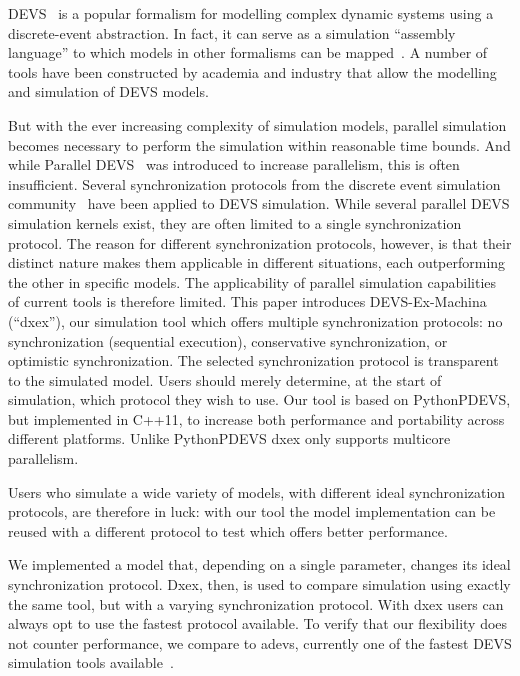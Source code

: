 \textsf{DEVS}~\cite{ClassicDEVS} is a popular formalism for modelling complex dynamic systems using a discrete-event abstraction.
In fact, it can serve as a simulation ``assembly language'' to which models in other formalisms can be mapped~\cite{DEVSbase}.
A number of tools have been constructed by academia and industry that allow the modelling and simulation of \textsf{DEVS} models.

But with the ever increasing complexity of simulation models, parallel simulation becomes necessary to perform the simulation within reasonable time bounds.
And while \textsf{Parallel DEVS}~\cite{ParallelDEVS} was introduced to increase parallelism, this is often insufficient.
Several synchronization protocols from the discrete event simulation community~\cite{FujimotoBook} have been applied to \textsf{DEVS} simulation.
While several parallel \textsf{DEVS} simulation kernels exist, they are often limited to a single synchronization protocol.
The reason for different synchronization protocols, however, is that their distinct nature makes them applicable in different situations, each outperforming the other in specific models.
The applicability of parallel simulation capabilities of current tools is therefore limited.
This paper introduces DEVS-Ex-Machina (``dxex''), our simulation tool which offers multiple synchronization protocols: no synchronization (sequential execution), conservative synchronization, or optimistic synchronization.
The selected synchronization protocol is transparent to the simulated model.
Users should merely determine, at the start of simulation, which protocol they wish to use.
Our tool is based on PythonPDEVS, but implemented in C++11, to increase both performance and portability across different platforms. Unlike PythonPDEVS dxex only supports multicore parallelism.

Users who simulate a wide variety of models, with different ideal synchronization protocols, are therefore in luck:
with our tool the model implementation can be reused with a different protocol to test which offers better performance.


We implemented a model that, depending on a single parameter, changes its ideal synchronization protocol.
Dxex, then, is used to compare simulation using exactly the same tool, but with a varying synchronization protocol. With dxex users can always opt to use the fastest protocol available.
To verify that our flexibility does not counter performance, we compare to adevs, currently one of the fastest \textsf{DEVS} simulation tools available~\cite{PythonPDEVS,DEVSSurvey}.

